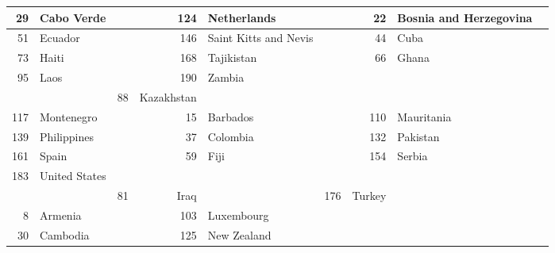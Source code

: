 \documentclass[12pt,a4paper]{article}
\begin{document}
\begin{longtable}{|r l c| r l c| r l c|}
29 & Cabo Verde &  & 124 & Netherlands &  & 22 & Bosnia and Herzegovina &  \\ \hline
51 & Ecuador &  & 146 & Saint Kitts and Nevis &  & 44 & Cuba &  \\ \hline
73 & Haiti &  & 168 & Tajikistan &  & 66 & Ghana &  \\ \hline
95 & Laos &  & 190 & Zambia \\ \hline &  & 88 & Kazakhstan &  \\ \hline
117 & Montenegro &  & 15 & Barbados &  & 110 & Mauritania &  \\ \hline
139 & Philippines &  & 37 & Colombia &  & 132 & Pakistan &  \\ \hline
161 & Spain &  & 59 & Fiji &  & 154 & Serbia &  \\ \hline
183 & United States \\ \hline &  & 81 & Iraq &  & 176 & Turkey &  \\ \hline
8 & Armenia &  & 103 & Luxembourg &  &  &  &  \\ \hline
30 & Cambodia &  & 125 & New Zealand &  &  &  &  \\ \hline
\end{longtable}
\end{document}
